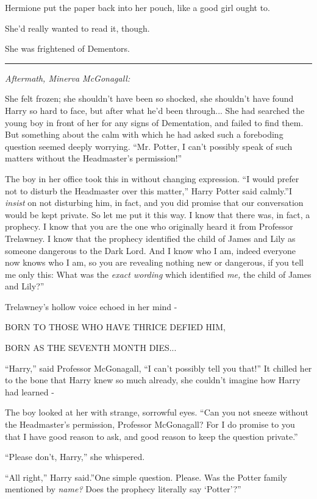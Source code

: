 Hermione put the paper back into her pouch, like a good girl ought to.

She'd really wanted to read it, though.

She was frightened of Dementors.

\begin{center}\rule{3in}{0.4pt}\end{center}

\emph{Aftermath, Minerva McGonagall:}

She felt frozen; she shouldn't have been so shocked, she shouldn't have
found Harry so hard to face, but after what he'd been through...
She had searched the young boy in front of her for any signs of
Dementation, and failed to find them. But something about the calm with
which he had asked such a foreboding question seemed deeply worrying.
``Mr. Potter, I can't possibly speak of such matters without the
Headmaster's permission!''

The boy in her office took this in without changing expression. ``I
would prefer not to disturb the Headmaster over this matter,'' Harry
Potter said calmly.''I \emph{insist} on not disturbing him, in fact, and
you did promise that our conversation would be kept private. So let me
put it this way. I know that there was, in fact, a prophecy. I know that
you are the one who originally heard it from Professor Trelawney. I know
that the prophecy identified the child of James and Lily as someone
dangerous to the Dark Lord. And I know who I am, indeed everyone now
knows who I am, so you are revealing nothing new or dangerous, if you
tell me only this: What was the \emph{exact wording} which identified
\emph{me,} the child of James and Lily?''

Trelawney's hollow voice echoed in her mind -

BORN TO THOSE WHO HAVE THRICE DEFIED HIM,

BORN AS THE SEVENTH MONTH DIES...

``Harry,'' said Professor McGonagall, ``I can't possibly tell you
that!'' It chilled her to the bone that Harry knew so much already, she
couldn't imagine how Harry had learned -

The boy looked at her with strange, sorrowful eyes. ``Can you not sneeze
without the Headmaster's permission, Professor McGonagall? For I do
promise to you that I have good reason to ask, and good reason to keep
the question private.''

``Please don't, Harry,'' she whispered.

``All right,'' Harry said.''One simple question. Please. Was the Potter
family mentioned by \emph{name?} Does the prophecy literally say
`Potter'?''


